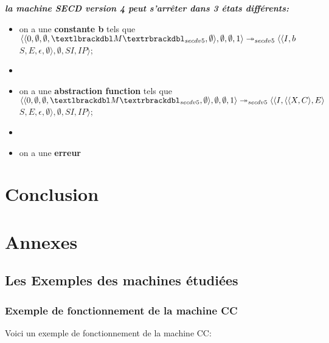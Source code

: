\documentclass[10pt,a4paper]{article}
\begin{document}
		
		\textbf{\textit{la machine SECD version 4 peut s'arrêter dans 3 états différents:}}
		\smallbreak
		\begin{itemize}
			\item[] on a une \textbf{constante b} tels que 
			$\langle\langle 0,\emptyset,\emptyset,\textlbrackdbl M\textrbrackdbl_{secdv5},\emptyset\rangle,\emptyset,\emptyset,1\rangle 
			\twoheadrightarrow_{secdv5} 
			\langle\langle I,b$ $S,E,\epsilon,\emptyset\rangle,\emptyset,SI,IP\rangle$;
			\item[] 
			\item[] on a une \textbf{abstraction function} tels que
			$\langle\langle 0,\emptyset,\emptyset,\textlbrackdbl M\textrbrackdbl_{secdv5},\emptyset\rangle,\emptyset,\emptyset,1\rangle 
			\twoheadrightarrow_{secdv5} 
			\langle\langle I,\langle\langle X,C\rangle,E\rangle$ $S,E,\epsilon,\emptyset\rangle,\emptyset,SI,IP\rangle$;
			\item[] 
			\item[] on a une \textbf{erreur} 
		\end{itemize}
		\newpage
		\section{Conclusion}
		
		\newpage
		
		\section{Annexes}
			\subsection{Les Exemples des machines étudiées}
				\subsubsection{Exemple de fonctionnement de la machine CC}\label{CC}
			
					Voici un exemple de fonctionnement de la machine CC:
					
\end{document}
